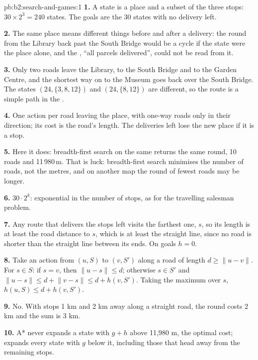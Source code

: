 \begin{solution}{pb:b2:search-and-games:1}
\textbf{1.} A state is a place and a subset of the three stops: $30 \times 2^3 = 240$ states. The goals are the 30 states
with no delivery left.

\textbf{2.} The same place means different things before and after a delivery: the round from the Library back past the
South Bridge would be a cycle if the state were the place alone, and the , ``all parcels delivered'', could not
be read from it.

\textbf{3.} Only two roads leave the Library, to the South Bridge and to the Garden Centre, and the shortest way on to the
Museum goes back over the South Bridge. The states $(24, \{3, 8, 12\})$ and $(24, \{8, 12\})$ are different, so the route
is a simple path in the .

\textbf{4.} One action per road leaving the place, with one-way roads only in their direction; its cost is the road's
length. The deliveries left lose the new place if it is a stop.

\textbf{5.} Here it does: breadth-first search on the same  returns the same round, 10 roads and
11\,980\,m. That is luck: breadth-first search minimises the number of roads, not the metres, and on another map the
round of fewest roads may be longer.

\textbf{6.} $30 \cdot 2^k$: exponential in the number of stops, as for the travelling salesman problem.

\textbf{7.} Any route that delivers the stops left visits the farthest one, $s$, so its length is at least the road
distance to $s$, which is at least the straight line, since no road is shorter than the straight line between its ends.
On goals $h = 0$.

\textbf{8.} Take an action from $(u, S)$ to $(v, S')$ along a road of length $d \geq \lVert u - v \rVert$. For $s \in S$:
if $s = v$, then $\lVert u - s \rVert \leq d$; otherwise $s \in S'$ and $\lVert u - s \rVert \leq d + \lVert v - s \rVert \leq d
+ h(v, S')$. Taking the maximum over $s$, $h(u, S) \leq d + h(v, S')$.

\textbf{9.} No. With stops 1 km and 2 km away along a straight road, the round costs 2 km and the sum is 3 km.

\textbf{10.} A* never expands a state with $g + h$ above 11,980 m, the optimal cost;  expands every
state with $g$ below it, including those that head away from the remaining stops.


\end{solution}
